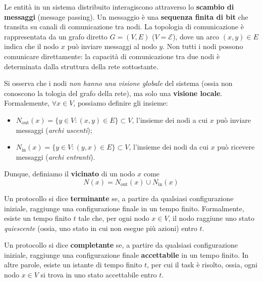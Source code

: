 \begin{definizione}[Comunicazione]
Le entità in un sistema distribuito interagiscono attraverso lo \textbf{scambio di messaggi} (message passing). Un messaggio è una \textbf{sequenza finita di bit} che transita su canali di comunicazione tra nodi. La topologia di comunicazione è rappresentata da un grafo diretto $G = (V, E)$ ($V = \mathcal{E}$), dove un arco $(x, y) \in E$ indica che il nodo $x$ può inviare messaggi al nodo $y$. Non tutti i nodi possono comunicare direttamente: la capacità di comunicazione tra due nodi è determinata dalla struttura della rete sottostante.

Si osserva che i nodi \textit{non hanno una visione globale} del sistema (ossia non conoscono la tologia del grafo della rete), ma solo una \textbf{visione locale}. Formalemente, $\forall x \in V$, possiamo definire gli insieme:
\begin{itemize}
    \item $N_{\text{out}}(x) = \{y \in V : (x, y) \in E\} \subset V$, l'insieme dei nodi a cui $x$ può inviare messaggi (\textit{archi uscenti});
    \item $N_{\text{in}}(x) = \{y \in V : (y, x) \in E\}  \subset V$, l'insieme dei nodi da cui $x$ può ricevere messaggi (\textit{archi entranti}).
\end{itemize}

Dunque, definiamo il \textbf{vicinato} di un nodo $x$ come 
\[
N(x) = N_{\text{out}}(x) \cup N_{\text{in}}(x)
\]
\end{definizione}

\begin{definizione}
Un protocollo si dice \textbf{terminante} se, a partire da qualsiasi configurazione iniziale, raggiunge una configurazione finale in un tempo finito. Formalmente, esiste un tempo finito $t$ tale che, per ogni nodo $x \in V$, il nodo raggiune uno stato \textit{quiescente} (ossia, uno stato in cui non esegue più azioni) entro $t$.
\end{definizione}

\begin{definizione}
Un protocollo si dice \textbf{completante} se, a partire da qualsiasi configurazione iniziale, raggiunge una configurazione finale \textbf{accettabile} in un tempo finito. In altre parole, esiste un istante di tempo finito $t$, per cui il task è risolto, ossia, ogni nodo $x \in V$ si trova in uno stato accettabile entro $t$.
\end{definizione}

